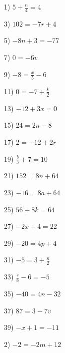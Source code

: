 \documentclass[11pt]{book}
\theoremstyle{definition}  %
\begin{document}
\begin{multicols}{2}
  1) $5 + \frac{n}{4} = 4$ \ \ \ \ \ \ \ \ \ \ \ \ \ \ \ \ \ \ \ \ \ \ \ \ \ \
  \ \ \ \ \ \ \
  
  3) $102 = - 7 r + 4$ \ \ \ \ \ \ \ \ \ \ \ \ \ \ \ \ \ \ \ \ \ \ \ \ \ \ \
  
  5) $- 8 n + 3 = - 77$ \ \ \ \ \ \ \ \ \ \ \ \ \ \ \ \ \ \ \ \ \ \ \ \ \
  
  7) $0 = - 6 v$ \ \ \ \ \ \ \ \ \ \ \ \ \ \ \ \ \ \ \ \ \ \ \ \ \ \ \ \ \ \
  \ \ \ \
  
  9) $- 8 = \frac{x}{5} - 6$ \ \ \ \ \ \ \ \ \ \ \ \ \ \ \ \ \ \ \ \ \ \ \ \
  \ \ \ \ \ \
  
  11) $0 = - 7 + \frac{k}{2}$ \ \ \ \ \ \ \ \ \ \ \ \ \ \ \ \ \ \ \ \ \ \ \ \
  \ \ \ \ \
  
  13) $- 12 + 3 x = 0$ \ \ \ \ \ \ \ \ \ \ \ \ \ \ \ \ \ \ \ \ \ \ \ \ \ \
  
  15) $24 = 2 n - 8$ \ \ \ \ \ \ \ \ \ \ \ \ \ \ \ \ \ \ \ \ \ \ \ \ \ \ \ \
  \
  
  17) $2 = - 12 + 2 r$ \ \ \ \ \ \ \ \ \ \ \ \ \ \ \ \ \ \ \ \ \ \ \ \ \ \ \
  
  19) $\frac{b}{3} + 7 = 10$ \ \ \ \ \ \ \ \ \ \ \ \ \ \ \ \ \ \ \ \ \ \ \ \
  \ \ \ \ \ \ \
  
  21) $152 = 8 n + 64$ \ \ \ \ \ \ \ \ \ \ \ \ \ \ \ \ \ \ \ \ \ \ \ \ \ \ \
  
  23) $- 16 = 8 a + 64$ \ \ \ \ \ \ \ \ \ \ \ \ \ \ \ \ \ \ \ \ \ \ \ \ \
  
  25) $56 + 8 k = 64$ \ \ \ \ \ \ \ \ \ \ \ \ \ \ \ \ \ \ \ \ \ \ \ \ \ \ \ \
  \
  
  27) $- 2 x + 4 = 22$ \ \ \ \ \ \ \ \ \ \ \ \ \ \ \ \ \ \ \ \ \ \ \ \ \ \ \
  
  29) $- 20 = 4 p + 4$ \ \ \ \ \ \ \ \ \ \ \ \ \ \ \ \ \ \ \ \ \ \ \ \ \ \ \
  
  31) $- 5 = 3 + \frac{n}{2}$ \ \ \ \ \ \ \ \ \ \ \ \ \ \ \ \ \ \ \ \ \ \ \ \
  \ \ \ \ \
  
  33) $\frac{r}{8} - 6 = - 5$ \ \ \ \ \ \ \ \ \ \ \ \ \ \ \ \ \ \ \ \ \ \ \ \
  \ \ \ \ \
  
  35) $- 40 = 4 n - 32$ \ \ \ \ \ \ \ \ \ \ \ \ \ \ \ \ \ \ \ \ \ \ \ \
  
  37) $87 = 3 - 7 v$ \ \ \ \ \ \ \ \ \ \ \ \ \ \ \ \ \ \ \ \ \ \ \ \ \ \ \ \
  \ \
  
  39) $- x + 1 = - 11$ \ \ \ \ \ \ \ \ \ \ \ \ \ \ \ \ \ \ \ \ \ \ \ \ \ \ \
  \ \ \ \ \ \ \ \ \
  
  2) $- 2 = - 2 m + 12$
  

\end{multicols}
\end{document}
